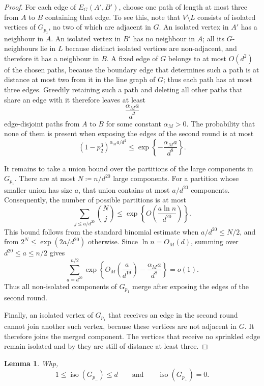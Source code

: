 \documentclass[10pt,a4paper]{article}
\newtheorem{lemma}[thm]{Lemma}
\newcommand{\iso}{\operatorname{iso}}
\begin{document}
\begin{proof}
For each edge of $E_G(A',B')$, choose one path of length at most three from $A$ to $B$ containing that edge.
To see this, note that $V\setminus L$ consists of isolated vertices of $G_{p_1}$, no two of which are adjacent in $G$.
An isolated vertex in $A'$ has a neighbour in $A$.
An isolated vertex in $B'$ has no neighbour in $A$; all its $G$-neighbours lie in $L$ because distinct isolated vertices are non-adjacent, and therefore it has a neighbour in $B$.
A fixed edge of $G$ belongs to at most $O(d^2)$ of the chosen paths, because the boundary edge that determines such a path is at distance at most two from it in the line graph of $G$; thus each path has at most three edges.
Greedily retaining such a path and deleting all other paths that share an edge with it therefore leaves at least
\[
  \frac{\alpha_M a}{d^2}
\]
edge-disjoint paths from $A$ to $B$ for some constant $\alpha_M>0$.
The probability that none of them is present when exposing the edges of the second round is at most
\[
  (1-p_2^3)^{\alpha_Ma/d^2}\le \exp\left\{-\frac{\alpha_Ma}{d^8}\right\}.
\]

It remains to take a union bound over the partitions of the large components in $G_{p_1}$. There are at most $N\coloneqq n/d^{20}$ large components.
For a partition whose smaller union has size $a$, that union contains at most $a/d^{20}$ components.
Consequently, the number of possible partitions is at most
\[
  \sum_{j\le a/d^{20}}\binom{N}{j}
  \le \exp\left\{O\left(\frac{a\ln n}{d^{20}}\right)\right\}.
\]
This bound follows from the standard binomial estimate when $a/d^{20}\le N/2$, and from $2^N\le\exp(2a/d^{20})$ otherwise.
Since $\ln n=O_M(d)$, summing over $d^{20}\le a\le n/2$ gives
\[
  \sum_{a=d^{20}}^{n/2}
  \exp\left\{O_M\left(\frac{a}{d^{19}}\right)-\frac{\alpha_Ma}{d^8}\right\}=o(1).
\]
Thus all non-isolated components of $G_{p_1}$ merge after exposing the edges of the second round.

Finally, an isolated vertex of $G_{p_1}$ that receives an edge in the second round cannot join another such vertex, because these vertices are not adjacent in $G$.
It therefore joins the merged component.
The vertices that receive no sprinkled edge remain isolated and by  they are still of distance at least three.
\end{proof}

\begin{lemma}\label{lem:number-isolates}
Whp,
\[
  1\le \iso(G_{p_-})\le d
  \qquad\text{and}\qquad
  \iso(G_{p_+})=0.
\]
\end{lemma}
\end{document}
